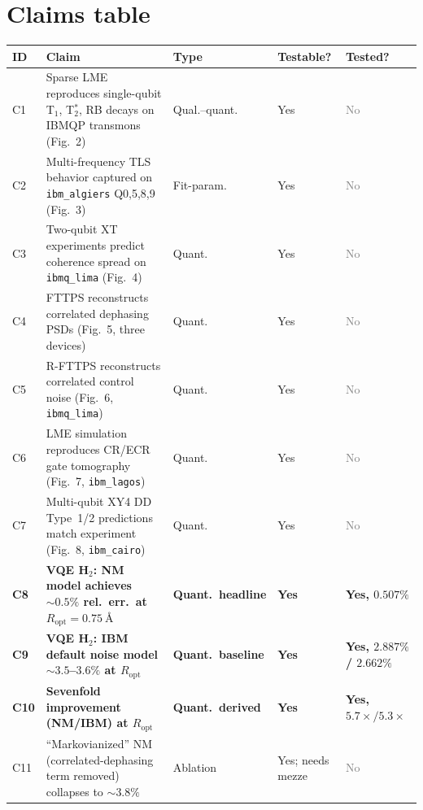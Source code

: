 \documentclass[11pt]{article}
\begin{document}
\section{Claims table}
\label{sec:claims}
\begin{longtable}{@{}p{}p{}p{}p{}p{}@{}}
\toprule
\textbf{ID} & \textbf{Claim} & \textbf{Type} & \textbf{Testable?} & \textbf{Tested?} \\
\midrule
C1 & Sparse LME reproduces single-qubit T$_1$, T$_2^*$, RB decays on IBMQP transmons (Fig.~2) & Qual.--quant. & Yes & \textcolor{gray}{No} \\
C2 & Multi-frequency TLS behavior captured on \texttt{ibm\_algiers} Q0,5,8,9 (Fig.~3) & Fit-param.\ & Yes & \textcolor{gray}{No} \\
C3 & Two-qubit XT experiments predict coherence spread on \texttt{ibmq\_lima} (Fig.~4) & Quant.\ & Yes & \textcolor{gray}{No} \\
C4 & FTTPS reconstructs correlated dephasing PSDs (Fig.~5, three devices) & Quant.\ & Yes & \textcolor{gray}{No} \\
C5 & R-FTTPS reconstructs correlated control noise (Fig.~6, \texttt{ibmq\_lima}) & Quant.\ & Yes & \textcolor{gray}{No} \\
C6 & LME simulation reproduces CR/ECR gate tomography (Fig.~7, \texttt{ibm\_lagos}) & Quant.\ & Yes & \textcolor{gray}{No} \\
C7 & Multi-qubit XY4 DD Type~1/2 predictions match experiment (Fig.~8, \texttt{ibm\_cairo}) & Quant.\ & Yes & \textcolor{gray}{No} \\
\textbf{C8} & \textbf{VQE H$_2$: NM model achieves $\sim\!0.5\%$ rel.\ err.\ at $R_{\mathrm{opt}}=\SI{0.75}{\angstrom}$} & \textbf{Quant.\ headline} & \textbf{Yes} & \textbf{Yes, $0.507\%$} \\
\textbf{C9} & \textbf{VQE H$_2$: IBM default noise model $\sim\!3.5$--$3.6\%$ at $R_{\mathrm{opt}}$} & \textbf{Quant.\ baseline} & \textbf{Yes} & \textbf{Yes, $2.887\%$ / $2.662\%$} \\
\textbf{C10} & \textbf{Sevenfold improvement (NM/IBM) at $R_{\mathrm{opt}}$} & \textbf{Quant.\ derived} & \textbf{Yes} & \textbf{Yes, $5.7\times/5.3\times$} \\
C11 & ``Markovianized'' NM (correlated-dephasing term removed) collapses to $\sim\!3.8\%$ & Ablation & Yes; needs mezze & \textcolor{gray}{No} \\
\bottomrule
\end{longtable}
\end{document}

